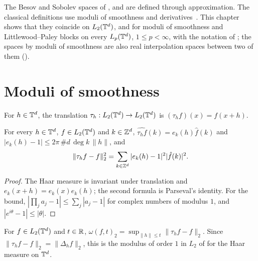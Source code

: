 The Besov and Sobolev spaces of ,  and  are
defined through approximation. The classical definitions use moduli of smoothness and
derivatives~\cite{Triebel, DeVoreLorentz}. This chapter shows that they coincide on
$L_2(\mathbb{T}^d)$, and for moduli of smoothness and Littlewood--Paley blocks on every $L_p(\mathbb{T}^d)$,
$1 \leq p < \infty$, with the notation of ; the spaces by moduli of smoothness
are also real interpolation spaces between two of them ().

\section{Moduli of smoothness}

\begin{definition}[Translation]
\label{def:translation}
\leanok
For $h \in \mathbb{T}^d$, the translation $\tau_h : L_2(\mathbb{T}^d) \to L_2(\mathbb{T}^d)$ is
$(\tau_h f)(x) = f(x + h)$.
\end{definition}

\begin{lemma}
\label{lem:translation-fourier}
\leanok
{}
For every $h \in \mathbb{T}^d$, $f \in L_2(\mathbb{T}^d)$ and $k \in \mathbb{Z}^d$,
$\widehat{\tau_h f}(k) = e_k(h) \hat f(k)$ and $|e_k(h) - 1| \leq 2\pi \, \#d \, \deg k \,
\|h\|$, and
\[
  \|\tau_h f - f\|_2^2 = \sum_{k \in \mathbb{Z}^d} |e_k(h) - 1|^2 |\hat f(k)|^2 .
\]
\end{lemma}

\begin{proof}
\leanok
The Haar measure is invariant under translation and $e_k(x + h) = e_k(x) e_k(h)$; the second
formula is Parseval's identity. For the bound, $|\prod_j a_j - 1| \leq \sum_j |a_j - 1|$ for
complex numbers of modulus $1$, and $|e^{i\theta} - 1| \leq |\theta|$.
\end{proof}

\begin{definition}
\label{def:modulus}
\leanok
{}
For $f \in L_2(\mathbb{T}^d)$ and $t \in \mathbb{R}$,
$\omega(f, t)_2 = \sup_{\|h\| \leq t} \|\tau_h f - f\|_2$. Since
$\|\tau_h f - f\|_2 = \|\Delta_h f\|_2$, this is the modulus of order $1$ in $L_2$ of
 for the Haar measure on $\mathbb{T}^d$.
\end{definition}

